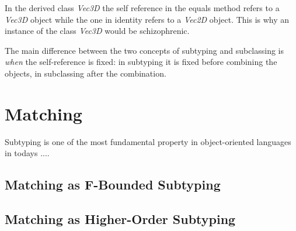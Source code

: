 In the derived class \emph{Vec3D} the self reference in the equals 
method refers to a \emph{Vec3D} object while the one in identity
refers to a \emph{Vec2D} object. This is why an instance of the class
\emph{Vec3D} would be schizophrenic.


%
%
%
%
%


The main difference between the two concepts of subtyping and subclassing is
\emph{when} the self-reference is fixed: in subtyping it is fixed before 
combining the objects, in subclassing after the combination.


\chapter{Matching}
Subtyping is one of the most fundamental property in object-oriented languages
in todays ....

\section{Matching as F-Bounded Subtyping}

\section{Matching as Higher-Order Subtyping}
